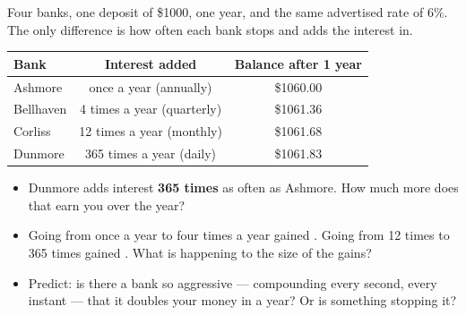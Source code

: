 \documentclass[10pt]{article}
\begin{document}
\begin{hookbox}
Four banks, one deposit of \$1000, one year, and the same advertised rate of $6\%$. The only difference
is how often each bank stops and adds the interest in.

\vspace{4pt}
\begin{center}
\small
\renewcommand{\arraystretch}{1.35}
\begin{tabular}{|l|c|c|}
\hline
\textbf{Bank} & \textbf{Interest added} & \textbf{Balance after 1 year} \\
\hline
Ashmore     & once a year (annually) & \$1060.00 \\
Bellhaven   & 4 times a year (quarterly) & \$1061.36 \\
Corliss     & 12 times a year (monthly) & \$1061.68 \\
Dunmore     & 365 times a year (daily) & \$1061.83 \\
\hline
\end{tabular}
\end{center}

\vspace{4pt}
\begin{itemize}\setlength{\itemsep}{2pt}
  \item Dunmore adds interest \textbf{365 times} as often as Ashmore. How much more does that earn you over the year? 
  \item Going from once a year to four times a year gained . Going from 12 times to 365 times gained . What is happening to the size of the gains? 
  \item Predict: is there a bank so aggressive --- compounding every second, every instant --- that it doubles your money in a year? Or is something stopping it? 
\end{itemize}
\end{hookbox}
\end{document}
